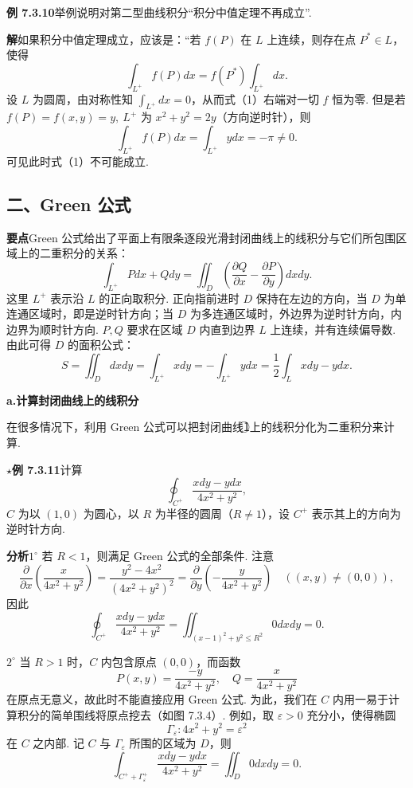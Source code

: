 \documentclass[UTF8,12pt,a4paper,fontset=fandol]{ctexart}
\begin{document}
\noindent\textbf{例 7.3.10}\quad 举例说明对第二型曲线积分“积分中值定理不再成立”.

\noindent\textbf{解}\quad 如果积分中值定理成立，应该是：“若 $f(P)$ 在 $L$ 上连续，则存在点 $P^*\in L$，使得
\[
\int_{L^+}f(P)dx=f(P^*)\int_{L^+}dx. \tag{1}
\]
设 $L$ 为圆周，由对称性知 $\displaystyle\int_{L^+}dx=0$，从而式（1）右端对一切 $f$ 恒为零. 但是若 $f(P)=f(x,y)=y,\ L^+$ 为 $x^2+y^2=2y$（方向逆时针），则
\[
\int_{L^+}f(P)dx=\int_{L^+}ydx=-\pi\ne0.
\]
可见此时式（1）不可能成立.

\subsection*{二、Green 公式}

\noindent\textbf{要点}\quad Green 公式给出了平面上有限条逐段光滑封闭曲线上的线积分与它们所包围区域上的二重积分的关系：
\[
\int_{L^+}Pdx+Qdy=\iint_D\left(\frac{\partial Q}{\partial x}-\frac{\partial P}{\partial y}\right)dxdy. \tag{A}
\]
这里 $L^+$ 表示沿 $L$ 的正向取积分. 正向指前进时 $D$ 保持在左边的方向，当 $D$ 为单连通区域时，即是逆时针方向；当 $D$ 为多连通区域时，外边界为逆时针方向，内边界为顺时针方向. $P,Q$ 要求在区域 $D$ 内直到边界 $L$ 上连续，并有连续偏导数. 由此可得 $D$ 的面积公式：
\[
S=\iint_Ddxdy=\int_{L^+}xdy=-\int_{L^+}ydx
=\frac12\int_Lxdy-ydx. \tag{B}
\]

\noindent\textbf{a.\quad 计算封闭曲线上的线积分}

在很多情况下，利用 Green 公式可以把封闭曲线\textcircled{1}上的线积分化为二重积分来计算.

\noindent\textbf{$\star$例 7.3.11}\quad 计算
\[
\oint_{C^+}\frac{xdy-ydx}{4x^2+y^2},
\]
$C$ 为以 $(1,0)$ 为圆心，以 $R$ 为半径的圆周（$R\ne1$），设 $C^+$ 表示其上的方向为逆时针方向.

\noindent\textbf{分析}\quad $1^\circ$ 若 $R<1$，则满足 Green 公式的全部条件. 注意
\[
\frac{\partial}{\partial x}\left(\frac{x}{4x^2+y^2}\right)
=\frac{y^2-4x^2}{(4x^2+y^2)^2}
=\frac{\partial}{\partial y}\left(-\frac{y}{4x^2+y^2}\right)\quad((x,y)\ne(0,0)), \tag{1}
\]
因此
\[
\oint_{C^+}\frac{xdy-ydx}{4x^2+y^2}
=\iint_{(x-1)^2+y^2\le R^2}0dxdy=0.
\]

$2^\circ$ 当 $R>1$ 时，$C$ 内包含原点 $(0,0)$，而函数
\[
P(x,y)=\frac{-y}{4x^2+y^2},\quad Q=\frac{x}{4x^2+y^2}
\]
在原点无意义，故此时不能直接应用 Green 公式. 为此，我们在 $C$ 内用一易于计算积分的简单围线将原点挖去（如图 7.3.4）. 例如，取 $\varepsilon>0$ 充分小，使得椭圆
\[
\Gamma_\varepsilon:4x^2+y^2=\varepsilon^2 \tag{2}
\]
在 $C$ 之内部. 记 $C$ 与 $\Gamma_\varepsilon$ 所围的区域为 $D$，则
\[
\int_{C^++\Gamma_\varepsilon^+}\frac{xdy-ydx}{4x^2+y^2}
=\iint_D0dxdy=0.
\]
\end{document}
